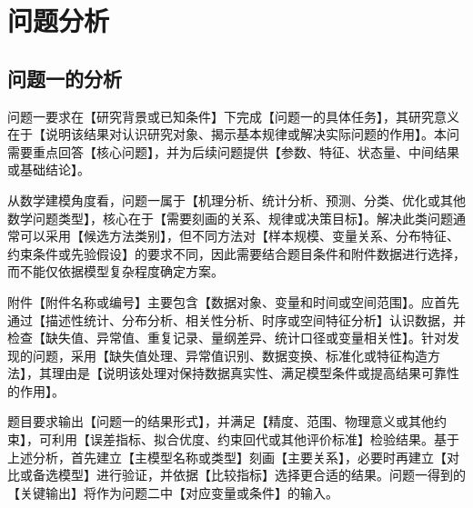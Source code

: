 %

\section{问题分析}

\subsection{问题一的分析}

问题一要求在【研究背景或已知条件】下完成【问题一的具体任务】，其研究意义在于【说明该结果对认识研究对象、揭示基本规律或解决实际问题的作用】。本问需要重点回答【核心问题】，并为后续问题提供【参数、特征、状态量、中间结果或基础结论】。

从数学建模角度看，问题一属于【机理分析、统计分析、预测、分类、优化或其他数学问题类型】，核心在于【需要刻画的关系、规律或决策目标】。解决此类问题通常可以采用【候选方法类别】，但不同方法对【样本规模、变量关系、分布特征、约束条件或先验假设】的要求不同，因此需要结合题目条件和附件数据进行选择，而不能仅依据模型复杂程度确定方案。

附件【附件名称或编号】主要包含【数据对象、变量和时间或空间范围】。应首先通过【描述性统计、分布分析、相关性分析、时序或空间特征分析】认识数据，并检查【缺失值、异常值、重复记录、量纲差异、统计口径或变量相关性】。针对发现的问题，采用【缺失值处理、异常值识别、数据变换、标准化或特征构造方法】，其理由是【说明该处理对保持数据真实性、满足模型条件或提高结果可靠性的作用】。

题目要求输出【问题一的结果形式】，并满足【精度、范围、物理意义或其他约束】，可利用【误差指标、拟合优度、约束回代或其他评价标准】检验结果。基于上述分析，首先建立【主模型名称或类型】刻画【主要关系】，必要时再建立【对比或备选模型】进行验证，并依据【比较指标】选择更合适的结果。问题一得到的【关键输出】将作为问题二中【对应变量或条件】的输入。

